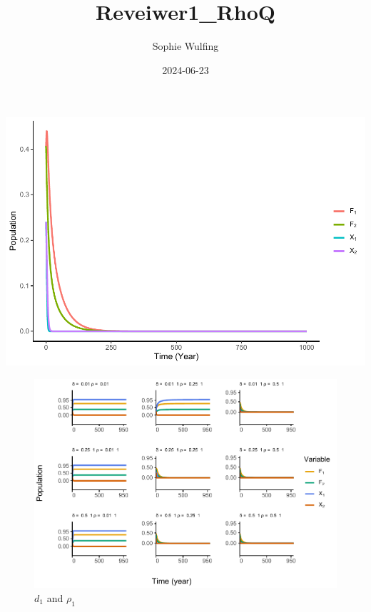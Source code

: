 \documentclass[
]{article}
\title{Reveiwer1\_RhoQ}
\author{Sophie Wulfing}
\date{2024-06-23}
\begin{document}
\maketitle

\includegraphics{ReviewerRhoTest_files/figure-latex/Bauch.Coupled-1.pdf}



\begin{figure}
\centering
\includegraphics{ReviewerRhoTest_files/figure-latex/influencerho1-1.pdf}
\caption{\label{fig:influencerho1}\(d_1\) and \(\rho_1\) \label{influenceRho1}}
\end{figure}
\end{document}
